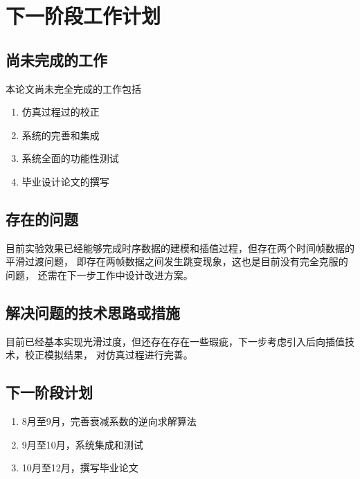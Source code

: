 \chapter{下一阶段工作计划}
\label{chap:next}


\section{尚未完成的工作}
	本论文尚未完全完成的工作包括
	
\begin{enumerate}
	\item 仿真过程过的校正
	\item 系统的完善和集成
	\item 系统全面的功能性测试
	\item 毕业设计论文的撰写
\end{enumerate}
\section{存在的问题}

目前实验效果已经能够完成时序数据的建模和插值过程，但存在两个时间帧数据的平滑过渡问题，
即存在两帧数据之间发生跳变现象，这也是目前没有完全克服的问题，
还需在下一步工作中设计改进方案。

\section{解决问题的技术思路或措施}
目前已经基本实现光滑过度，但还存在存在一些瑕疵，下一步考虑引入后向插值技术，校正模拟结果，
对仿真过程进行完善。
\section{下一阶段计划}

\begin{enumerate}
	\item 8月至9月，完善衰减系数的逆向求解算法
	\item 9月至10月，系统集成和测试
	\item 10月至12月，撰写毕业论文	
\end{enumerate}




